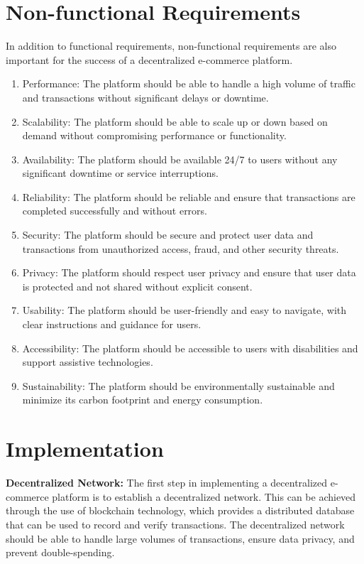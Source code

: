 \documentclass{report}
\begin{document}
\section{Non-functional Requirements} 


 In addition to functional requirements, non-functional requirements are also important for the success of a decentralized e-commerce platform.

\begin{enumerate}
    \item Performance: The platform should be able to handle a high volume of traffic and transactions without significant delays or downtime.
    \item Scalability: The platform should be able to scale up or down based on demand without compromising performance or functionality.
    \item Availability: The platform should be available 24/7 to users without any significant downtime or service interruptions.
    \item Reliability: The platform should be reliable and ensure that transactions are completed successfully and without errors.

    \item Security: The platform should be secure and protect user data and transactions from unauthorized access, fraud, and other security threats.
    \item Privacy: The platform should respect user privacy and ensure that user data is protected and not shared without explicit consent.
    \item Usability: The platform should be user-friendly and easy to navigate, with clear instructions and guidance for users.
    \item Accessibility: The platform should be accessible to users with disabilities and support assistive technologies.
    \item Sustainability: The platform should be environmentally sustainable and minimize its carbon footprint and energy consumption.
\end{enumerate}
\newpage
\section{Implementation}

 \textbf{Decentralized Network:} 
The first step in implementing a decentralized e-commerce platform is to establish a decentralized network. This can be achieved through the use of blockchain technology, which provides a distributed database that can be used to record and verify transactions. The decentralized network should be able to handle large volumes of transactions, ensure data privacy, and prevent double-spending.
\end{document}
